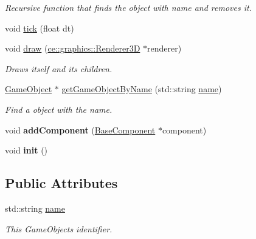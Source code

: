 \begin{DoxyCompactItemize}
\begin{DoxyCompactList}\small\item\em Recursive function that finds the object with name and removes it. \end{DoxyCompactList}\item 
void \hyperlink{classce_1_1game_1_1_game_object_aa77b42484f1a5c0abf1d4bf1564becac}{tick} (float dt)
\item 
void \hyperlink{classce_1_1game_1_1_game_object_ad5e81a50f4472e7557ec949eb3cc9413}{draw} (\hyperlink{classce_1_1graphics_1_1_renderer3_d}{ce\+::graphics\+::\+Renderer3D} $\ast$renderer)
\begin{DoxyCompactList}\small\item\em Draws itself and its children. \end{DoxyCompactList}\item 
\hyperlink{classce_1_1game_1_1_game_object}{Game\+Object} $\ast$ \hyperlink{classce_1_1game_1_1_game_object_a2fcc1608d7c352ba88a5fcc5d99eb5e2}{get\+Game\+Object\+By\+Name} (std\+::string \hyperlink{classce_1_1game_1_1_game_object_a1de1f674c70df3bbba6aefb938ad8f32}{name})
\begin{DoxyCompactList}\small\item\em Find a object with the name. \end{DoxyCompactList}\item 
\mbox{\label{classce_1_1game_1_1_game_object_aff7595869f54126ae6fd16d38870f7a0}} 
void {\bfseries add\+Component} (\hyperlink{classce_1_1game_1_1_base_component}{Base\+Component} $\ast$component)
\item 
\mbox{\label{classce_1_1game_1_1_game_object_ac4f59a89b96dffe070a928f64ddfe382}} 
void {\bfseries init} ()
\end{DoxyCompactItemize}
\subsection*{Public Attributes}
\begin{DoxyCompactItemize}
\item 
\mbox{\label{classce_1_1game_1_1_game_object_a1de1f674c70df3bbba6aefb938ad8f32}} 
std\+::string \hyperlink{classce_1_1game_1_1_game_object_a1de1f674c70df3bbba6aefb938ad8f32}{name}
\begin{DoxyCompactList}\small\item\em This Game\+Objects identifier. \end{DoxyCompactList}\end{DoxyCompactItemize}
